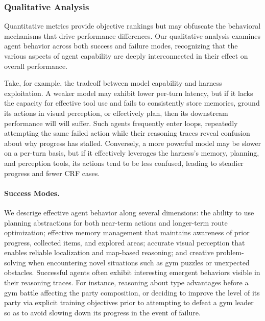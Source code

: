 \subsubsection{Qualitative Analysis}\label{sec:qualitative_analysis}

Quantitative metrics provide objective rankings but may obfuscate the behavioral mechanisms that drive performance differences. Our qualitative analysis examines agent behavior across both success and failure modes, recognizing that the various aspects of agent capability are deeply interconnected in their effect on overall performance.

Take, for example, the tradeoff between model capability and harness exploitation. A weaker model may exhibit lower per-turn latency, but if it lacks the capacity for effective tool use and fails to consistently store memories, ground its actions in visual perception, or effectively plan, then its downstream performance will will suffer. Such agents frequently enter loops, repeatedly attempting the same failed action while their reasoning traces reveal confusion about why progress has stalled. Conversely, a more powerful model may be slower on a per-turn basis, but if it effectively leverages the harness's memory, planning, and perception tools, its actions tend to be less confused, leading to steadier progress and fewer CRF cases.

\paragraph{Success Modes.} We descrige effective agent behavior along several dimensions: the ability to use planning abstractions for both near-term actions and longer-term route optimization; effective memory management that maintains awareness of prior progress, collected items, and explored areas; accurate visual perception that enables reliable localization and map-based reasoning; and creative problem-solving when encountering novel situations such as gym puzzles or unexpected obstacles. Successful agents often exhibit interesting emergent behaviors visible in their reasoning traces. For instance, reasoning about type advantages before a gym battle affecting the party composition, or deciding to improve the level of its party via explicit training objectives prior to attempting to defeat a gym leader so as to avoid slowing down its progress in the event of failure. 

